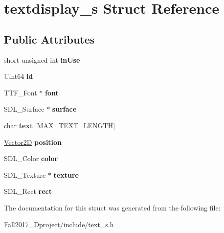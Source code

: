 \hypertarget{structtextdisplay__s}{}\section{textdisplay\+\_\+s Struct Reference}
\label{structtextdisplay__s}
\subsection*{Public Attributes}
\begin{DoxyCompactItemize}
\item 
\mbox{\label{structtextdisplay__s_af5143a57ea1af730676f932c36968716}} 
short unsigned int {\bfseries in\+Use}
\item 
\mbox{\label{structtextdisplay__s_a38abb59f4244b98b2ac8eecda6273059}} 
Uint64 {\bfseries id}
\item 
\mbox{\label{structtextdisplay__s_ae58f03caa59cc6a818827f9e5330532d}} 
T\+T\+F\+\_\+\+Font $\ast$ {\bfseries font}
\item 
\mbox{\label{structtextdisplay__s_a7633db40c8365def9fabfd5a5b251c70}} 
S\+D\+L\+\_\+\+Surface $\ast$ {\bfseries surface}
\item 
\mbox{\label{structtextdisplay__s_a09f7475490d9a43573c02fdf996367a4}} 
char {\bfseries text} \mbox{[}M\+A\+X\+\_\+\+T\+E\+X\+T\+\_\+\+L\+E\+N\+G\+TH\mbox{]}
\item 
\mbox{\label{structtextdisplay__s_a0e30b1b9dfb79cac56e8f3d031890420}} 
\hyperlink{struct_vector2_d}{Vector2D} {\bfseries position}
\item 
\mbox{\label{structtextdisplay__s_a37ac77cd1903864630237c181b09a963}} 
S\+D\+L\+\_\+\+Color {\bfseries color}
\item 
\mbox{\label{structtextdisplay__s_a9277884c9e2732340ce8a31019c5ac9a}} 
S\+D\+L\+\_\+\+Texture $\ast$ {\bfseries texture}
\item 
\mbox{\label{structtextdisplay__s_ac2c6456923a40c84c3212a6bac6ad000}} 
S\+D\+L\+\_\+\+Rect {\bfseries rect}
\end{DoxyCompactItemize}


The documentation for this struct was generated from the following file\+:\begin{DoxyCompactItemize}
\item 
Fall2017\+\_\+Dproject/include/text\+\_\+s.\+h\end{DoxyCompactItemize}
